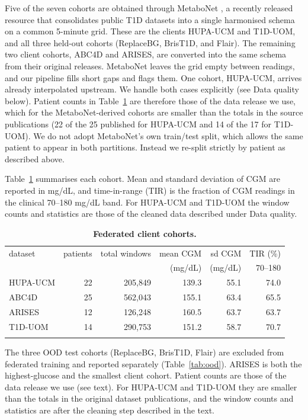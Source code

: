 \documentclass[10pt,letterpaper]{article}
\newlength\savedwidth
\newcommand\thickhline{\noalign{\global\savedwidth\arrayrulewidth\global\arrayrulewidth 2pt}%
\hline
\noalign{\global\arrayrulewidth\savedwidth}}
\begin{document}
Five of the seven cohorts are obtained through MetaboNet
\cite{wolff2026metabonet}, a recently released resource that consolidates
public T1D datasets into a single harmonised schema on a common 5-minute grid.
These are the clients HUPA-UCM and T1D-UOM, and all three held-out cohorts
(ReplaceBG, BrisT1D, and Flair). The remaining two client cohorts, ABC4D and
ARISES, are converted into the same schema from their original releases.
MetaboNet leaves the grid empty between readings, and our pipeline fills short
gaps and flags them. One cohort, HUPA-UCM, arrives already interpolated
upstream. We handle both cases explicitly (see Data quality below). Patient
counts in
Table~\ref{tab:datasets} are therefore those of the data release we use, which
for the MetaboNet-derived cohorts are smaller than the totals in the source
publications (22 of the 25 published for HUPA-UCM and 14 of the 17 for
T1D-UOM). We do not adopt MetaboNet's own train/test split, which allows the
same patient to appear in both partitions. Instead we re-split strictly by
patient as described above.

Table~\ref{tab:datasets} summarises each cohort. Mean and standard deviation of
CGM are reported in mg/dL, and time-in-range (TIR) is the fraction of CGM
readings in the clinical 70--180 mg/dL band. For HUPA-UCM and T1D-UOM the
window counts and statistics are those of the cleaned data described under
Data quality.

\begin{table}[!ht]
\centering
\captionsetup{justification=centering,singlelinecheck=on}
\caption{\bf Federated client cohorts.}
\label{tab:datasets}
\begin{tabular}{lrrrrr}
\thickhline
dataset & patients & total windows & mean CGM & sd CGM & TIR (\%) \\
        &          &               & (mg/dL)  & (mg/dL) & 70--180  \\
\hline
HUPA-UCM & 22 & 205,849 & 139.3 & 55.1 & 74.0 \\
ABC4D    & 25 & 562,043 & 155.1 & 63.4 & 65.5 \\
ARISES   & 12 & 126,248 & 160.5 & 63.7 & 63.7 \\
T1D-UOM  & 14 & 290,753 & 151.2 & 58.7 & 70.7 \\
\thickhline
\end{tabular}
\begin{center}
{\small The three OOD test cohorts (ReplaceBG, BrisT1D, Flair) are excluded from
federated training and reported separately (Table~\ref{tab:ood}). ARISES is both the
highest-glucose and the smallest client cohort. Patient counts are those of the
data release we use (see text). For HUPA-UCM and T1D-UOM they are smaller than
the totals in the original dataset publications, and the window counts and
statistics are after the cleaning step described in the text.}
\end{center}
\end{table}
\end{document}
